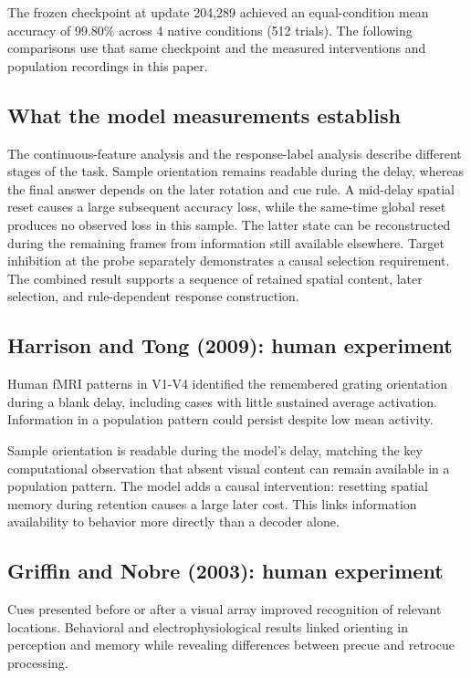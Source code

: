 \documentclass[11pt]{article}
\begin{document}
The frozen checkpoint at update 204,289 achieved an equal-condition mean accuracy of 99.80\% across 4 native conditions (512 trials). The following comparisons use that same checkpoint and the measured interventions and population recordings in this paper.

\subsection{What the model measurements establish}
The continuous-feature analysis and the response-label analysis describe different stages of the task. Sample orientation remains readable during the delay, whereas the final answer depends on the later rotation and cue rule. A mid-delay spatial reset causes a large subsequent accuracy loss, while the same-time global reset produces no observed loss in this sample. The latter state can be reconstructed during the remaining frames from information still available elsewhere. Target inhibition at the probe separately demonstrates a causal selection requirement. The combined result supports a sequence of retained spatial content, later selection, and rule-dependent response construction.

\subsection{Harrison and Tong (2009): human experiment}
Human fMRI patterns in V1-V4 identified the remembered grating orientation during a blank delay, including cases with little sustained average activation. Information in a population pattern could persist despite low mean activity. \cite{bio_harrison}

Sample orientation is readable during the model’s delay, matching the key computational observation that absent visual content can remain available in a population pattern. The model adds a causal intervention: resetting spatial memory during retention causes a large later cost. This links information availability to behavior more directly than a decoder alone.

\subsection{Griffin and Nobre (2003): human experiment}
Cues presented before or after a visual array improved recognition of relevant locations. Behavioral and electrophysiological results linked orienting in perception and memory while revealing differences between precue and retrocue processing. \cite{bio_griffin}
\end{document}

